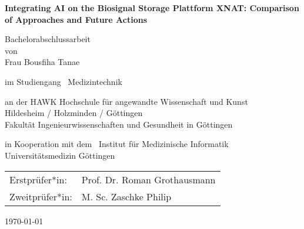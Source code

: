 %
%
\begin{titlepage}
	\begin{center}
		{\Large \textbf{Integrating AI on the Biosignal Storage Plattform XNAT: Comparison of Approaches and Future Actions}}
		
		\vspace{\fill}
		
		Bachelorabschlussarbeit  \\
		von \\
		Frau Bousfiha Tanae
		
		\vspace{0.6cm}
		
		im Studiengang \ Medizintechnik \\
		
		\vspace{0.4cm}
		
		an der HAWK Hochschule für angewandte Wissenschaft und Kunst\\
		Hildesheim / Holzminden / Göttingen\\
		Fakultät Ingenieurwissenschaften und Gesundheit in Göttingen
		
		\vspace{1cm}



		\begin{center}
	\def\svgwidth{8cm}
        
       \end{center}

		
		in Kooperation mit dem \ Institut für Medizinische Informatik 
    \\Universitätsmedizin Göttingen\\
		

    \vspace{2cm}
		\begin{center}
	\def\svgwidth{8cm}
        
       \end{center}
		
		\vspace{0.1cm}
		
		\vspace{2.0cm}
		
		\begin{tabular}{p{3cm}l}
			Erstprüfer*in: & Prof. Dr. Roman Grothausmann \\ 
			Zweitprüfer*in: & M. Sc. Zaschke Philip\\  
		\end{tabular} 
		
		\vspace{1.6cm}
	
		\today
		
	\end{center}
	
	
	
\end{titlepage}










